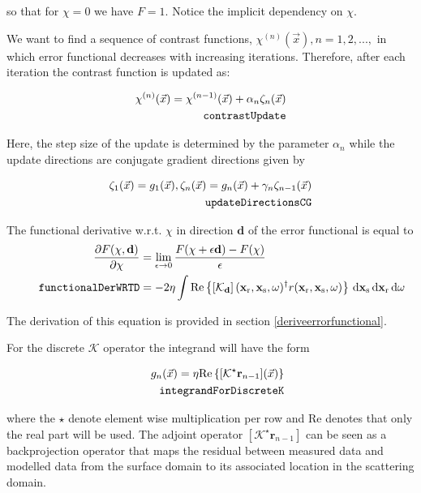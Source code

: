 \documentclass[10pt,a4paper]{article}
\newcommand{\partder}[2]{\ensuremath{\frac{\partial #1}{\partial #2}}}
\newcommand{\df}[1]{\, \ensuremath{\mbox{d}#1}}
\newcommand{\real}[1]{\text{Re} \left\{ #1 \right\}}
\newcommand{\xs}{\mathbf{x}_\text{s}}
\newcommand{\xr}{\mathbf{x}_\text{r}}
\begin{document}
so that for $\chi = 0$ we have $F = 1$. Notice the implicit dependency
on $\chi$.

We want to find a sequence of contrast functions,
$\chi^{(n)}(\vec{x}), n = 1,2,...,$ in which error functional
decreases with increasing iterations. Therefore, after each iteration
the contrast function is updated as:

\begin{align} \label{eq:contrastUpdate} \chi^{(n)}(\vec{x}) =
\chi^{(n-1)}(\vec{x}) + \alpha_n\zeta_n(\vec{x})\\
\tag*{\texttt{contrastUpdate}}
\end{align}

Here, the step size of the update is determined by the parameter
$\alpha_n$ while the update directions are conjugate gradient
directions given by

\begin{align} \label{eq:updateDirectionsCG}\zeta_1(\vec{x}) = g_1(\vec{x})
,\zeta_n(\vec{x}) = g_n(\vec{x}) + \gamma_n\zeta_{n-1}(\vec{x})\\
\tag*{\texttt{updateDirectionsCG}}
\end{align}

The functional derivative w.r.t. $\chi$ in direction $\mathbf{d}$ of
the error functional is equal to
\begin{align}
\label{eq:functionalDerWRTD}
\partder{F(\mathbf{\chi}, \mathbf{d})}{\mathbf{\chi}} & =
\lim_{\epsilon \rightarrow 0} \frac{F(\mathbf{\chi} + \epsilon
\mathbf{d}) - F(\mathbf{\chi})}{\epsilon} \\
\tag*{\texttt{functionalDerWRTD}}
& = -2 \eta \int \real{\left[\mathcal{K}_\mathbf{d} \right](\xr, \xs,
\omega)^{\dagger} r (\xr, \xs, \omega)} \df{\xs} \df{\xr} \df{\omega}
\end{align}

The derivation of this equation is provided in section
\ref{deriveerrorfunctional}.

For the discrete $\mathcal{K}$ operator the integrand will have the form

\begin{align} \label{eq:integrandForDiscreteK} g_n(\vec{x}) = \eta
\real{[\mathcal{K}^\star\mathbf{r}_{n-1}](\vec{x})}\\
\tag*{\texttt{integrandForDiscreteK}}
\end{align}

where the $\star$ denote element wise multiplication per row and Re
denotes that only the real part will be used.
The adjoint operator $[\mathcal{K}^\star\mathbf{r}_{n-1}]$ can be seen
as a backprojection operator that maps the residual between measured
data and modelled data from the surface domain to its associated
location in the scattering domain.
\end{document}

